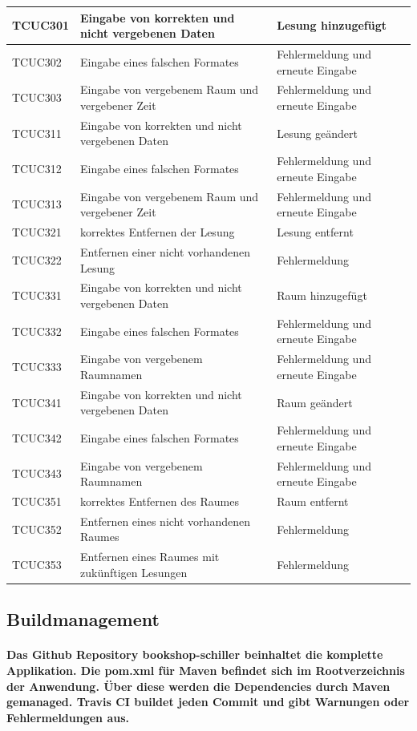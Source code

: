 \documentclass[a4paper]{article}
\begin{document}
\begin{longtable}{|p{50px}|p{200px}|p{100px}|}
	TCUC301 & Eingabe von korrekten und nicht vergebenen Daten & Lesung hinzugefügt \\ \hline
	TCUC302 & Eingabe eines falschen Formates & Fehlermeldung und erneute Eingabe \\ \hline
	TCUC303 & Eingabe von vergebenem Raum und vergebener Zeit & Fehlermeldung und erneute Eingabe \\ \hline
	TCUC311 & Eingabe von korrekten und nicht vergebenen Daten & Lesung geändert \\ \hline
	TCUC312 & Eingabe eines falschen Formates & Fehlermeldung und erneute Eingabe \\ \hline
	TCUC313 & Eingabe von vergebenem Raum und vergebener Zeit & Fehlermeldung und erneute Eingabe \\ \hline
	TCUC321 & korrektes Entfernen der Lesung & Lesung entfernt \\ \hline
	TCUC322 & Entfernen einer nicht vorhandenen Lesung & Fehlermeldung \\ \hline	
	TCUC331 & Eingabe von korrekten und nicht vergebenen Daten & Raum hinzugefügt \\ \hline
	TCUC332 & Eingabe eines falschen Formates & Fehlermeldung und erneute Eingabe \\ \hline
	TCUC333 & Eingabe von vergebenem Raumnamen & Fehlermeldung und erneute Eingabe \\ \hline
	TCUC341 & Eingabe von korrekten und nicht vergebenen Daten & Raum geändert \\ \hline
	TCUC342 & Eingabe eines falschen Formates & Fehlermeldung und erneute Eingabe \\ \hline
	TCUC343 & Eingabe von vergebenem Raumnamen & Fehlermeldung und erneute Eingabe \\ \hline
	TCUC351 & korrektes Entfernen des Raumes & Raum entfernt \\ \hline
	TCUC352 & Entfernen eines nicht vorhandenen Raumes & Fehlermeldung \\ \hline
	TCUC353 & Entfernen eines Raumes mit zukünftigen Lesungen & Fehlermeldung \\ \hline
\end{longtable}

\subsection{Buildmanagement}

\paragraph{Das Github Repository bookshop-schiller beinhaltet die komplette Applikation. Die pom.xml für Maven befindet sich im Rootverzeichnis der Anwendung. Über diese werden die Dependencies durch Maven gemanaged. Travis CI buildet jeden Commit und gibt Warnungen oder Fehlermeldungen aus.}
\end{document}
